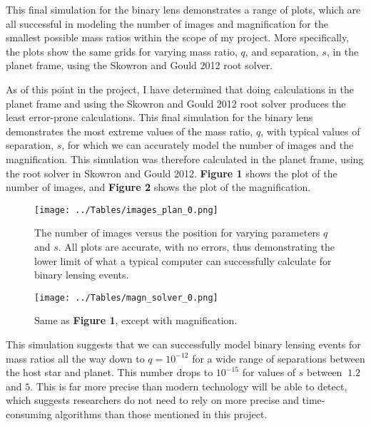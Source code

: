 \documentclass{article}
\begin{document}

This final simulation for the binary lens demonstrates a range of plots,
which are all successful in modeling the number of images and magnification
for the smallest possible mass ratios within the scope of my project. More
specifically, the plots show the same grids for varying mass ratio, $q$, and
separation, $s$, in the planet frame, using the Skowron and Gould 2012 root
solver.

As of this point in the project, I have determined that doing calculations
in the planet frame and using the Skowron and Gould 2012 root solver produces
the least error-prone calculations. This final simulation for the binary
lens demonstrates the most extreme values of the mass ratio, $q$, with
typical values of separation, $s$, for which we can accurately model the
number of images and the magnification. This simulation was therefore
calculated in the planet frame, using the root solver in Skowron and Gould
2012. \textbf{Figure 1} shows the plot of the number of images, and
\textbf{Figure 2} shows the plot of the magnification.

\begin{figure}
	\texttt{[image: ../Tables/images\_plan\_0.png]}
	\caption{The number of images versus the position for varying parameters
	$q$ and $s$. All plots are accurate, with no errors, thus demonstrating
	the lower limit of what a typical computer can successfully calculate
	for binary lensing events.}
\end{figure}

\begin{figure}
	\texttt{[image: ../Tables/magn\_solver\_0.png]}
	\caption{Same as \textbf{Figure 1}, except with magnification.}
\end{figure}


This simulation suggests that we can successfully model binary lensing
events for mass ratios all the way down to $q=10^{-12}$ for a wide range of
separations between the host star and planet. This number drops to
$10^{-15}$ for values of $s$ between $~1.2$ and $5$. This is far more
precise than modern technology will be able to detect, which suggests
researchers do not need to rely on more precise and time-consuming
algorithms than those mentioned in this project.
\end{document}
